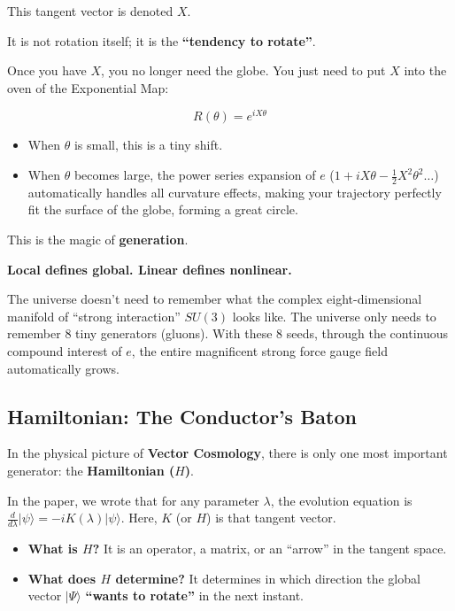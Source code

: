 This tangent vector is denoted $X$.

It is not rotation itself; it is the \textbf{``tendency to rotate''}.

Once you have $X$, you no longer need the globe. You just need to put $X$ into the oven of the Exponential Map:

$$R(\theta) = e^{i X \theta}$$

\begin{itemize}
\item When $\theta$ is small, this is a tiny shift.

\item When $\theta$ becomes large, the power series expansion of $e$ ($1 + iX\theta - \frac{1}{2}X^2\theta^2 \ldots$) automatically handles all curvature effects, making your trajectory perfectly fit the surface of the globe, forming a great circle.
\end{itemize}

This is the magic of \textbf{generation}.

\textbf{Local defines global. Linear defines nonlinear.}

The universe doesn't need to remember what the complex eight-dimensional manifold of ``strong interaction'' $SU(3)$ looks like. The universe only needs to remember 8 tiny generators (gluons). With these 8 seeds, through the continuous compound interest of $e$, the entire magnificent strong force gauge field automatically grows.

\subsection{Hamiltonian: The Conductor's Baton}

In the physical picture of \textbf{Vector Cosmology}, there is only one most important generator: the \textbf{Hamiltonian ($H$)}.

In the paper, we wrote that for any parameter $\lambda$, the evolution equation is $\frac{d}{d\lambda}|\psi\rangle = -iK(\lambda)|\psi\rangle$. Here, $K$ (or $H$) is that tangent vector.

\begin{itemize}
\item \textbf{What is $H$?} It is an operator, a matrix, or an ``arrow'' in the tangent space.

\item \textbf{What does $H$ determine?} It determines in which direction the global vector $|\Psi\rangle$ \textbf{``wants to rotate''} in the next instant.
\end{itemize}

